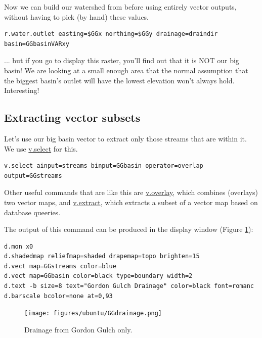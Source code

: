\documentclass{book}
\begin{document}
Now we can build our watershed from before using entirely vector outputs, without having to pick (by hand) these values.

\begin{lstlisting}
r.water.outlet easting=$GGx northing=$GGy drainage=draindir basin=GGbasinVARxy
\end{lstlisting}

... but if you go to display this raster, you'll find out that it is NOT our big basin! We are looking at a small enough area that the normal assumption that the biggest basin's outlet will have the lowest elevation won't always hold. Interesting!

\subsection{Extracting vector subsets}

Let's use our big basin vector to extract only those streams that are within it. We use \url{v.select} for this.

\begin{lstlisting}
v.select ainput=streams binput=GGbasin operator=overlap output=GGstreams
\end{lstlisting}

Other useful commands that are like this are \url{v.overlay}, which combines (overlays) two vector maps, and \url{v.extract}, which extracts a subset of a vector map based on database queeries.

The output of this command can be produced in the display window (Figure \ref{fig:GGdrainage}):

\begin{lstlisting}
d.mon x0
d.shadedmap reliefmap=shaded drapemap=topo brighten=15
d.vect map=GGstreams color=blue
d.vect map=GGbasin color=black type=boundary width=2
d.text -b size=8 text="Gordon Gulch Drainage" color=black font=romanc
d.barscale bcolor=none at=0,93
\end{lstlisting}

\begin{figure}[h]
 \begin{center}
 \texttt{[image: figures/ubuntu/GGdrainage.png]}
 \caption{Drainage from Gordon Gulch only.}
 \label{fig:GGdrainage}
 \end{center}
\end{figure}
\end{document}
